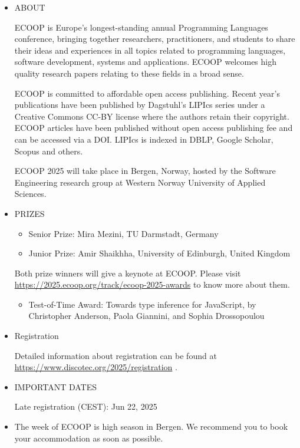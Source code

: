 \documentclass[prodmode,acmtecs]{acmsmall} %
\begin{document}
\begin{itemize}\item  ABOUT 
 
  ECOOP is Europe’s longest-standing annual Programming Languages conference, bringing together researchers, practitioners, and students to share their ideas and experiences in all topics related to programming languages, software development, systems and applications. ECOOP welcomes high quality research papers relating to these fields in a broad sense. 
 
  ECOOP is committed to affordable open access publishing. Recent year’s publications have been published by Dagstuhl’s LIPIcs series under a Creative Commons CC-BY license where the authors retain their copyright. ECOOP articles have been published without open access publishing fee and can be accessed via a DOI. LIPIcs is indexed in DBLP, Google Scholar, Scopus and others. 
 
  ECOOP 2025 will take place in Bergen, Norway, hosted by the Software Engineering research group at Western Norway University of Applied Sciences. 
 
\item  PRIZES 
 
\begin{itemize}\item  Senior Prize: Mira Mezini, TU Darmstadt, Germany
\item  Junior Prize: Amir Shaikhha, University of Edinburgh, United Kingdom
\end{itemize} 
  Both prize winners will give a keynote at ECOOP. Please visit \href{https://2025.ecoop.org/track/ecoop-2025-awards}{https://2025.ecoop.org/track/ecoop-2025-awards} to know more about them. 
 
\begin{itemize}\item  Test-of-Time Award: Towards type inference for JavaScript, by Christopher Anderson, Paola Giannini, and Sophia Drossopoulou
\end{itemize} 
\item  Registration 
 
  Detailed information about registration can be found at \href{https://www.discotec.org/2025/registration}{https://www.discotec.org/2025/registration} . 
 
\item  IMPORTANT DATES 
 
Late registration (CEST): Jun 22, 2025 
 
\item  The week of ECOOP is high season in Bergen.  We recommend you to book your accommodation as soon as possible. 
 

\end{itemize}
\end{document}
